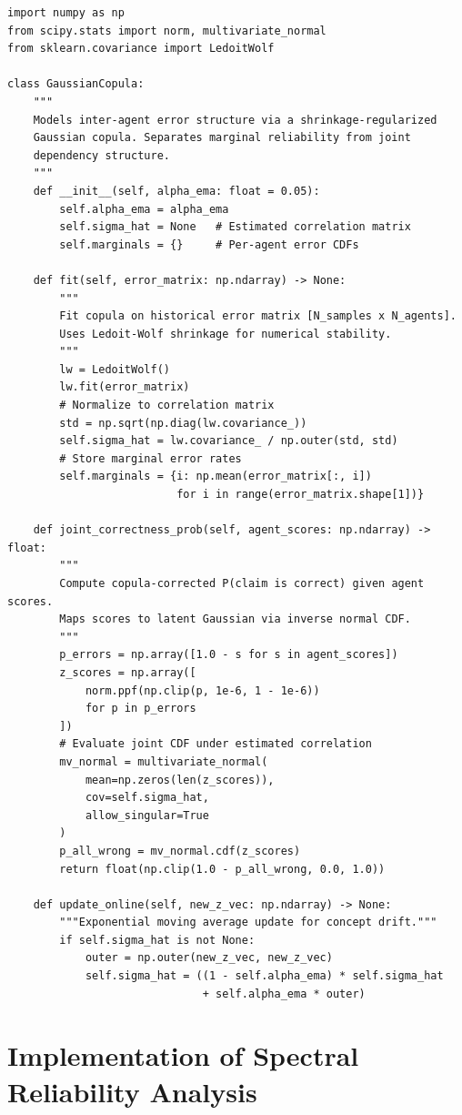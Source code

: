 \documentclass[12pt,a4paper]{report}
\begin{document}
\begin{lstlisting}[caption={Gaussian Copula: Correlation Estimation and Joint Probability},
                   label={lst:copula}]
import numpy as np
from scipy.stats import norm, multivariate_normal
from sklearn.covariance import LedoitWolf

class GaussianCopula:
    """
    Models inter-agent error structure via a shrinkage-regularized
    Gaussian copula. Separates marginal reliability from joint
    dependency structure.
    """
    def __init__(self, alpha_ema: float = 0.05):
        self.alpha_ema = alpha_ema
        self.sigma_hat = None   # Estimated correlation matrix
        self.marginals = {}     # Per-agent error CDFs

    def fit(self, error_matrix: np.ndarray) -> None:
        """
        Fit copula on historical error matrix [N_samples x N_agents].
        Uses Ledoit-Wolf shrinkage for numerical stability.
        """
        lw = LedoitWolf()
        lw.fit(error_matrix)
        # Normalize to correlation matrix
        std = np.sqrt(np.diag(lw.covariance_))
        self.sigma_hat = lw.covariance_ / np.outer(std, std)
        # Store marginal error rates
        self.marginals = {i: np.mean(error_matrix[:, i])
                          for i in range(error_matrix.shape[1])}

    def joint_correctness_prob(self, agent_scores: np.ndarray) -> float:
        """
        Compute copula-corrected P(claim is correct) given agent scores.
        Maps scores to latent Gaussian via inverse normal CDF.
        """
        p_errors = np.array([1.0 - s for s in agent_scores])
        z_scores = np.array([
            norm.ppf(np.clip(p, 1e-6, 1 - 1e-6))
            for p in p_errors
        ])
        # Evaluate joint CDF under estimated correlation
        mv_normal = multivariate_normal(
            mean=np.zeros(len(z_scores)),
            cov=self.sigma_hat,
            allow_singular=True
        )
        p_all_wrong = mv_normal.cdf(z_scores)
        return float(np.clip(1.0 - p_all_wrong, 0.0, 1.0))

    def update_online(self, new_z_vec: np.ndarray) -> None:
        """Exponential moving average update for concept drift."""
        if self.sigma_hat is not None:
            outer = np.outer(new_z_vec, new_z_vec)
            self.sigma_hat = ((1 - self.alpha_ema) * self.sigma_hat
                              + self.alpha_ema * outer)
\end{lstlisting}

\section{Implementation of Spectral Reliability Analysis}
\end{document}
